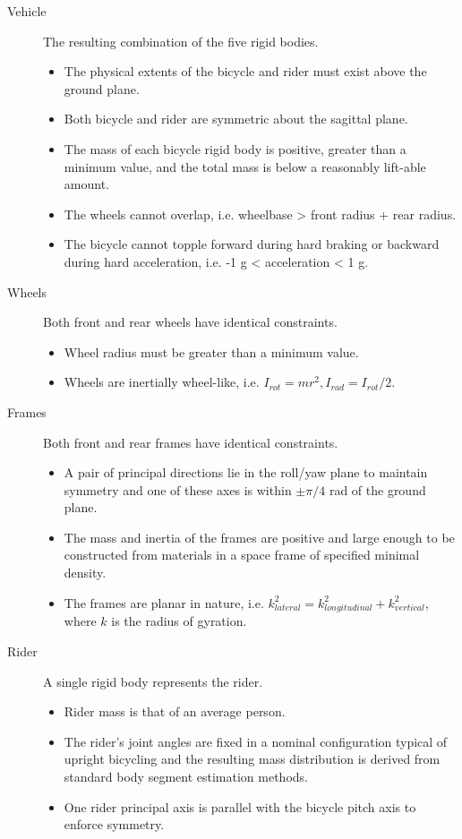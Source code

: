 \documentclass{bmd2019a}
\begin{document}
\begin{description}
  \item[Vehicle] The resulting combination of the five rigid bodies.
    \begin{itemize}
      \itemsep0em
      \item The physical extents of the bicycle and rider must exist above the
        ground plane.
      \item Both bicycle and rider are symmetric about the sagittal
        plane.
      \item The mass of each bicycle rigid body is positive, greater than a
        minimum value, and the total mass is below a reasonably lift-able
        amount.
      \item The wheels cannot overlap, i.e. wheelbase > front radius + rear
        radius.
      \item The bicycle cannot topple forward during hard braking or backward
        during hard acceleration, i.e. -1 g < acceleration < 1 g.
    \end{itemize}

  \item[Wheels] Both front and rear wheels have identical constraints.
    \begin{itemize}
      \itemsep0em
      \item Wheel radius must be greater than a minimum value.
      \item Wheels are inertially wheel-like, i.e.  $I_{rot}=mr^2,
        I_{rad}=I_{rot}/2$.
    \end{itemize}

  \item[Frames] Both front and rear frames have identical constraints.
    \begin{itemize}
      \itemsep0em
      \item A pair of principal directions lie in the roll/yaw
        plane to maintain symmetry and one of these axes is within $\pm \pi/4$
        rad of the ground plane.
      \item The mass and inertia of the frames are positive and large enough to
        be constructed from materials in a space frame of specified minimal
        density.
      \item The frames are planar in nature, i.e.
        $k_{lateral}^2=k_{longitudinal}^2+k_{vertical}^2$, where $k$ is the
        radius of gyration.
    \end{itemize}

  \item[Rider] A single rigid body represents the rider.
    \begin{itemize}
      \itemsep0em
      \item Rider mass is that of an average person.
      \item The rider's joint angles are fixed in a nominal configuration
        typical of upright bicycling and the resulting mass distribution is
        derived from standard body segment estimation methods.
      \item One rider principal axis is parallel with the bicycle pitch axis to
        enforce symmetry.
    \end{itemize}


\end{description}
\end{document}
